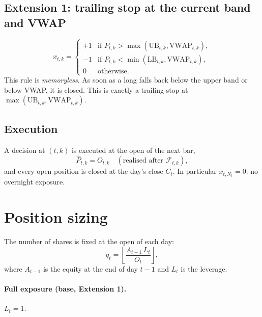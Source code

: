 \documentclass[11pt,a4paper]{article}
\newcommand{\UB}{\mathrm{UB}}
\newcommand{\LB}{\mathrm{LB}}
\newcommand{\VWAP}{\mathrm{VWAP}}
\newcommand{\1}{\mathbf{1}}
\begin{document}
\subsection{Extension 1: trailing stop at the current band and VWAP}
\begin{equation}\label{eq:vwap}
  x_{t,k} =
  \begin{cases}
    +1 & \text{if } P_{t,k} > \max(\UB_{t,k}, \VWAP_{t,k}),\\
    -1 & \text{if } P_{t,k} < \min(\LB_{t,k}, \VWAP_{t,k}),\\
    0  & \text{otherwise.}
  \end{cases}
\end{equation}
This rule is \emph{memoryless}. As soon as a long falls back below the upper band or below VWAP, it is
closed. This is exactly a trailing stop at $\max(\UB_{t,k},\VWAP_{t,k})$.

\subsection{Execution}
A decision at $(t,k)$ is executed at the open of the next bar,
\[
  \hat P_{t,k} = O_{t,k} \quad(\text{realised after } \mathcal F_{t,k}),
\]
and every open position is closed at the day's close $C_t$. In particular $x_{t,N_t} = 0$:
no overnight exposure.

\section{Position sizing}

The number of shares is fixed at the open of each day:
\begin{equation}\label{eq:shares}
  q_t = \left\lfloor \frac{A_{t-1}\, L_t}{O_t} \right\rfloor ,
\end{equation}
where $A_{t-1}$ is the equity at the end of day $t-1$ and $L_t$ is the leverage.

\paragraph{Full exposure (base, Extension 1).} $L_t = 1$.
\end{document}
